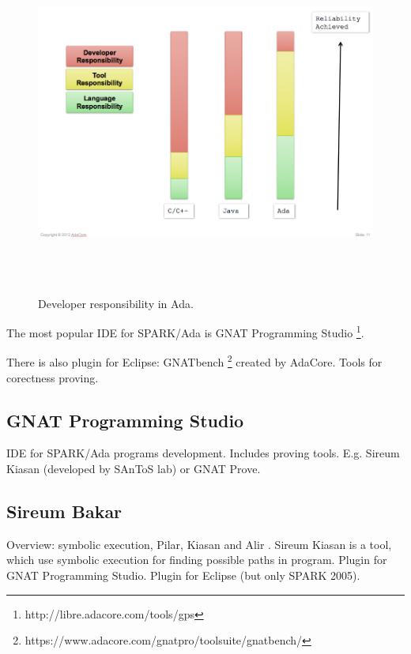 \begin{figure}[ht]%
    \begin{center}
    	\includegraphics[height=4.5in]{figures/developer_responsibility_in_ada.png}
    	\caption{Developer responsibility in Ada.}
    \end{center}
\end{figure}
The most popular IDE for SPARK/Ada is GNAT Programming Studio \footnote{http://libre.adacore.com/tools/gps}.

There is also plugin for Eclipse: GNATbench \footnote{https://www.adacore.com/gnatpro/toolsuite/gnatbench/} created by AdaCore. 
Tools for corectness proving.

\subsection{GNAT Programming Studio}
\label{background:spark:gps}
IDE for SPARK/Ada programs development. Includes proving tools. E.g. Sireum Kiasan (developed by SAnToS lab) or GNAT Prove.


\subsection{Sireum Bakar}
\label{background:spark:sireum}
Overview: symbolic execution, Pilar, Kiasan and Alir \cite{Hari:Thesis}.
Sireum Kiasan \cite{Kiasan:Paper} is a tool, which use symbolic execution for finding possible paths in program.
Plugin for GNAT Programming Studio.
Plugin for Eclipse (but only SPARK 2005).


